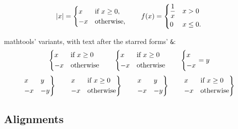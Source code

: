 \documentclass[11pt,letterpaper]{article}
\theoremstyle{definition}
\theoremstyle{remark}
\DeclarePairedDelimiter{\abs}{\lvert}{\rvert}
\begin{document}
\[ \abs{x} = \begin{cases} x & \text{if } x \geq 0, \\ -x & \text{otherwise}, \end{cases} \qquad f(x) = \begin{dcases} \frac{1}{x} & x > 0 \\ 0 & x \leq 0. \end{dcases} \]

mathtools' variants, with text after the starred forms' \verb|&|:
\[ \begin{cases*} x & if $x \geq 0$\\ -x & otherwise\end{cases*} \qquad \begin{dcases*} x & if $x \geq 0$\\ -x & otherwise\end{dcases*} \qquad \begin{dcases} x \\ -x \end{dcases} = y \]
\[ \begin{rcases} x & y \\ -x & -y \end{rcases} \qquad \begin{rcases*} x & if $x \geq 0$\\ -x & otherwise\end{rcases*} \qquad \begin{drcases} x & y \\ -x & -y \end{drcases} \qquad \begin{drcases*} x & if $x \geq 0$\\ -x & otherwise\end{drcases*} \]

\subsection{Alignments}
\end{document}
